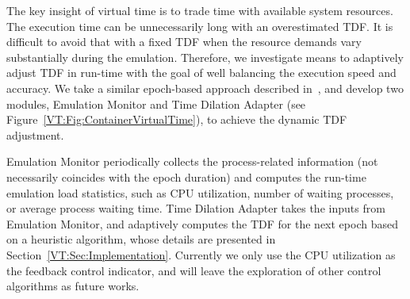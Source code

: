 The key insight of virtual time is to trade time with available system resources.
The execution time can be unnecessarily long with an overestimated TDF. 
It is difficult to avoid that with a fixed TDF when the resource demands vary substantially during the emulation. 
Therefore, we investigate means to adaptively adjust TDF in run-time with the goal of well balancing the execution speed and accuracy. 
We take a similar epoch-based approach described in~\cite{NtwkEmultAdaptVirtTime}, and develop two modules,
Emulation Monitor and Time Dilation Adapter (see Figure~\ref{VT:Fig:ContainerVirtualTime}), to achieve the dynamic TDF adjustment. 

Emulation Monitor periodically collects the process-related information (not necessarily coincides with the epoch duration)
and computes the run-time emulation load statistics, such as CPU utilization, number of waiting processes, or average process waiting time. 
Time Dilation Adapter takes the inputs from Emulation Monitor, and adaptively computes the TDF for the next epoch based on a heuristic algorithm,
whose details are presented in Section~\ref{VT:Sec:Implementation}. 
Currently we only use the CPU utilization as the feedback control indicator, and will leave the exploration of other control algorithms as future works. 

